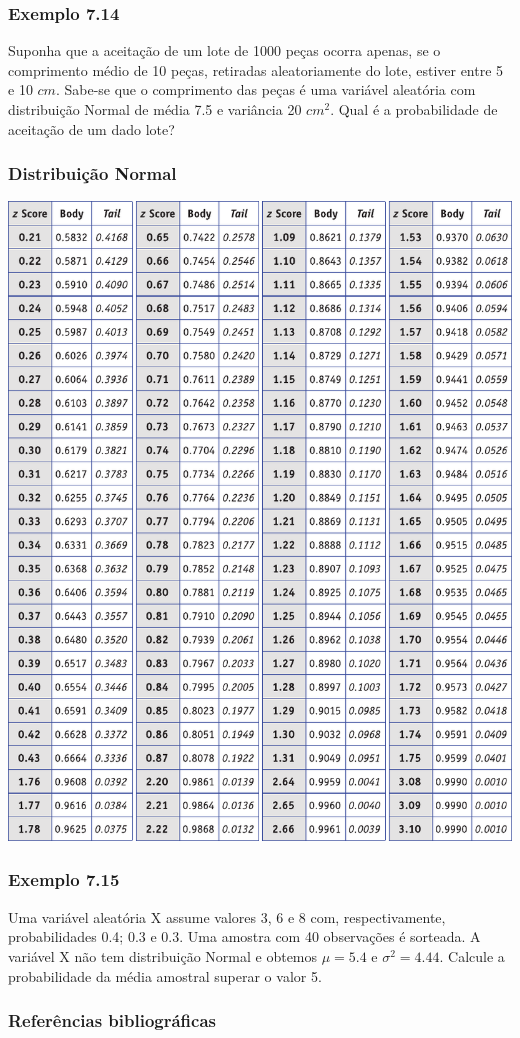 \documentclass[11pt]{beamer}
\begin{document}
\begin{frame}
\begin{columns}
\begin{column}{0.5\textwidth}
\begin{center}
     \end{center}
\end{column}
\end{columns}

\end{frame}

\begin{frame}
\frametitle{Exemplo 7.14}
Suponha que a aceitação de um lote de 1000 peças ocorra apenas, se o comprimento médio de 10 peças, retiradas aleatoriamente do lote, estiver entre 5 e 10 \(cm\). Sabe-se que o comprimento das peças é uma variável aleatória com distribuição Normal de média 7.5 e variância 20 \(cm^2\). Qual é a probabilidade de aceitação de um dado lote?
\vspace{1in}
\vspace{1in}

\end{frame}

\begin{frame}
\frametitle{Distribuição Normal}

\begin{center}\includegraphics[width=0.5\linewidth]{figs/ztab_crop2} \end{center}
\end{frame}


\begin{frame}
\frametitle{Exemplo 7.15}
Uma variável aleatória X assume valores 3, 6 e 8 com, respectivamente, probabilidades 0.4; 0.3 e 0.3. Uma amostra com 40 observações é sorteada. A variável X não tem distribuição Normal e obtemos \(\mu=5.4\) e \(\sigma^2=4.44\). Calcule a probabilidade da média amostral superar o valor 5.
\vspace{1in}
\vspace{1in}

\end{frame}

\begin{frame}
\frametitle{Referências bibliográficas}
\printbibliography
\end{frame}
\end{document}
